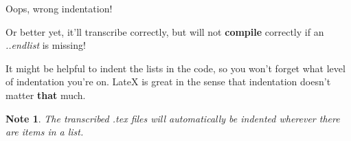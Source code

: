 \documentclass[12pt]{article}
\newtheorem{Note}[Lemma]{Note}
\begin{document}
Oops, wrong indentation!

Or better yet, it'll transcribe correctly,
but will not \textbf{compile} correctly if an \emph{..endlist} is missing!

It might be helpful to indent the lists in the code, so you won't forget what level of indentation you're on. LateX is great in the sense that indentation doesn't matter \textbf{that} much.

\begin{Note}
The transcribed .tex files will automatically be indented wherever there are items in a list.
\end{Note}
\end{document}
